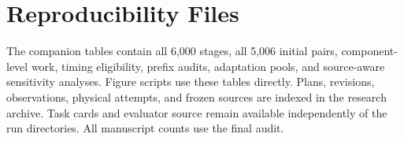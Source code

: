 \section{Reproducibility Files}
The companion tables contain all 6,000 stages, all 5,006 initial pairs, component-level work, timing eligibility, prefix audits, adaptation pools, and source-aware sensitivity analyses. Figure scripts use these tables directly. Plans, revisions, observations, physical attempts, and frozen sources are indexed in the research archive. Task cards and evaluator source remain available independently of the run directories. All manuscript counts use the final audit.
